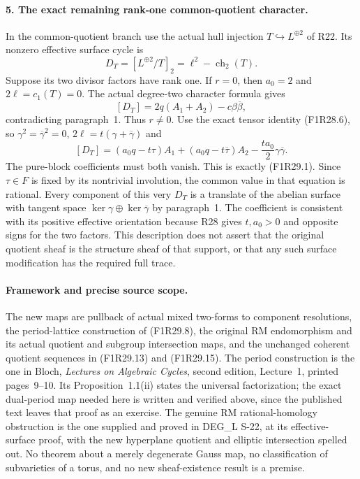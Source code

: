 \paragraph{5. The exact remaining rank-one common-quotient character.}
In the common-quotient branch use the
actual hull injection $T\hookrightarrow
L^{\oplus2}$ of R22. Its nonzero effective
surface cycle is
\[
             D_T=[L^{\oplus2}/T]_2
                         =\ell^2-\operatorname{ch}_2(T).
 \tag{F1R29.15}
\]
Suppose its two divisor factors have
rank one. If $r=0$, then $a_0=2$
and $2\ell=c_1(T)=0$. The actual
degree-two character formula gives
\[
                 [D_T]=2q(A_1+A_2)-c\beta\overline\beta,
 \tag{F1R29.16}
\]
contradicting paragraph~1.
Thus $r\ne0$. Use the exact tensor
identity (F1R28.6), so
$\gamma^2=\overline\gamma^2=0$,
$2\ell=t(\gamma+\overline\gamma)$ and
\[
 [D_T]=(a_0q-t\tau)A_1
       +(a_0q-t\overline\tau)A_2
                   -\frac{ta_0}{2}\gamma\overline\gamma.
 \tag{F1R29.17}
\]
The pure-block coefficients must both
vanish. This is exactly (F1R29.1).
Since $\tau\in F$ is fixed by its
nontrivial involution, the common value
in that equation is rational.
Every component of this very $D_T$
is a translate of the abelian surface
with tangent space
$\ker\gamma\oplus\ker\overline\gamma$
by paragraph~1. The coefficient is
consistent with its positive effective
orientation because R28 gives $t,a_0>0$
and opposite signs for the two factors.
This description does not assert that
the original quotient sheaf is the
structure sheaf of that support, or
that any such surface modification
has the required full trace.

\paragraph{Framework and precise source scope.}
The new maps are pullback of actual
mixed two-forms to component resolutions,
the period-lattice construction of
(F1R29.8), the original RM endomorphism
and its actual quotient and subgroup
intersection maps, and the unchanged
coherent quotient sequences in
(F1R29.13) and (F1R29.15).
The period construction is the one
in Bloch, \emph{Lectures on Algebraic
Cycles}, second edition, Lecture~1,
printed pages~9--10. Its Proposition~1.1(ii)
states the universal factorization;
the exact dual-period map needed here
is written and verified above, since
the published text leaves that proof
as an exercise. The genuine RM
rational-homology obstruction is
the one supplied and proved in
DEG\_L S-22, at its effective-surface
proof, with the new hyperplane quotient
and elliptic intersection spelled out.
No theorem about a merely degenerate
Gauss map, no classification of
subvarieties of a torus, and no new
sheaf-existence result is a premise.


